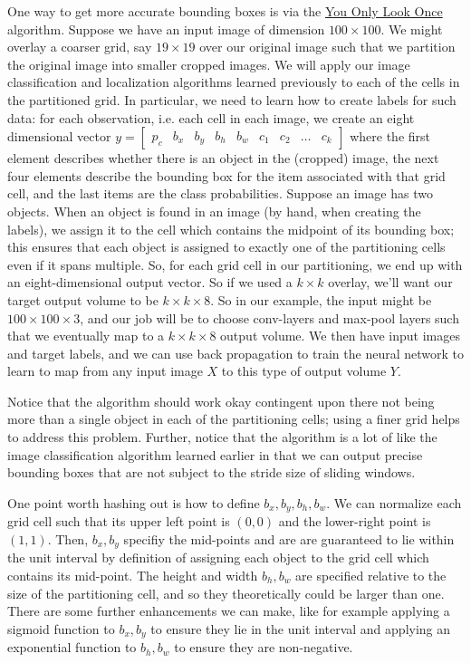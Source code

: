 \documentclass[12pt]{article}
\begin{document}
One way to get more accurate bounding boxes is via the \href{https://arxiv.org/abs/1506.02640}{You Only Look Once} algorithm. Suppose we have an input image of dimension $100 \times 100$. We might overlay a coarser grid, say $19 \times 19$ over our original image such that we partition the original image into smaller cropped images. We will apply our image classification and localization algorithms learned previously to each of the cells in the partitioned grid. In particular, we need to learn how to create labels for such data: for each observation, i.e. each cell in each image, we create an eight dimensional vector $y = \begin{bmatrix} p_c & b_x & b_y & b_h & b_w & c_1 & c_2 & \ldots & c_k \end{bmatrix}$ where the first element describes whether there is an object in the (cropped) image, the next four elements describe the bounding box for the item associated with that grid cell, and the last items are the class probabilities. Suppose an image has two objects. When an object is found in an image (by hand, when creating the labels), we assign it to the cell which contains the midpoint of its bounding box; this ensures that each object is assigned to exactly one of the partitioning cells even if it spans multiple. So, for each grid cell in our partitioning, we end up with an eight-dimensional output vector. So if we used a $k \times k$ overlay,
we'll want our target output volume to be $k \times k \times 8$. So in our example, the input might be $100 \times 100 \times 3$, and our job will be to choose conv-layers and max-pool layers such that we eventually map to a $k \times k \times 8$ output volume. We then have input images and target labels, and we can use back propagation to train the neural network to learn to map from any input image $X$ to this type of output volume $Y$.

Notice that the algorithm should work okay contingent upon there not being more than a single object in each of the partitioning cells; using a finer grid helps to address this problem. Further, notice that the algorithm is a lot of like the image classification algorithm learned earlier in that we can output precise bounding boxes that are not subject to the stride size of sliding windows.

One point worth hashing out is how to define $b_x, b_y, b_h, b_w$. We can normalize each grid cell such that its upper left point is $(0,0)$ and the lower-right point is $(1,1)$. Then, $b_x, b_y$ specifiy the mid-points and are are guaranteed to lie within the unit interval by definition of assigning each object to the grid cell which contains its mid-point. The height and width $b_h, b_w$ are specified relative to the size of the partitioning cell, and so they theoretically could be larger than one. There are some further enhancements we can make, like for example applying a sigmoid function to $b_x,b_y$ to ensure they lie in the unit interval and applying an exponential function to $b_h, b_w$ to ensure they are non-negative.
\end{document}
